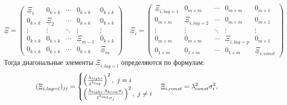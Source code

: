 \documentclass[11pt]{article} %
\newcommand{\prior}{\underline}
\begin{document}
\begin{equation*}
\prior \Xi=\begin{pmatrix}
\prior \Xi_1&0_{k\times k}&\cdots&0_{k\times k}&0_{k\times k}\\
0_{k\times k}& \prior \Xi_2& \cdots &0_{k\times k}&0_{k\times k}\\
\vdots &\vdots& \ddots&\vdots& \vdots\\
0_{k\times k}&0_{k\times k}&\cdots&\prior\Xi_{m-1} & 0_{k\times k}\\
0_{k\times k}&0_{k\times k}&\cdots&0_{k\times k}&\prior \Xi_m
\end{pmatrix}
\quad
\prior \Xi_i=\begin{pmatrix}
\prior \Xi_{i,lag=1}&0_{m\times m}&\cdots&0_{m\times m}&0_{m\times 1}\\
0_{m\times m}& \prior \Xi_{i,lag=2}& \cdots &0_{m\times m}&0_{m\times 1}\\
\vdots &\vdots& \ddots& \vdots&\vdots\\
0_{m\times m}&0_{m\times m}&\cdots&\prior \Xi_{i,lag=p}&0_{m\times 1}\\
0_{1\times m}&0_{1\times m}&\cdots&0_{1\times m}&\prior \Xi_{i,const}
\end{pmatrix}
\end{equation*}
Тогда  диагональные элементы  $\prior \Xi_{i,lag=l}$ определяются по формулам:
\begin{equation}
(\prior \Xi_{i,lag=l})_{jj}
=\begin{cases}
\left(\frac{\lambda_{tight}}{l^{\lambda_{lag}}}\right)^2,\ j=i\\
\left(\frac{\lambda_{tight}\cdot\lambda_{kron}\sigma_i}{l^{\lambda_{lag}}\sigma_j}\right)^2, \; j\ne i
\end{cases}\\
\prior \Xi_{i,const}
=\lambda_{const}^2\sigma_i^2, 
\label{minnesota_variance}
\end{equation}

\end{document}

